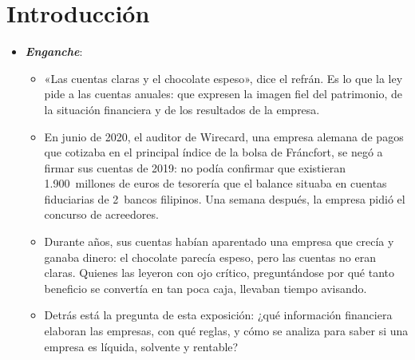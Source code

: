 \documentclass[11pt]{article}
\begin{document}
\tceetitulo

\section*{Introducción}

\begin{itemize}
\item \textbf{\emph{Enganche}}:
  \begin{itemize}
  \item «Las cuentas claras y el chocolate espeso», dice el refrán. Es lo que la ley pide a las cuentas anuales: que expresen la imagen fiel del patrimonio, de la situación financiera y de los resultados de la empresa.
  \item En junio de 2020, el auditor de Wirecard, una empresa alemana de pagos que cotizaba en el principal índice de la bolsa de Fráncfort, se negó a firmar sus cuentas de 2019: no podía confirmar que existieran 1.900~millones de euros de tesorería que el balance situaba en cuentas fiduciarias de 2~bancos filipinos. Una semana después, la empresa pidió el concurso de acreedores\nocite{OCCRP2020Wirecard}.
  \item Durante años, sus cuentas habían aparentado una empresa que crecía y ganaba dinero: el chocolate parecía espeso, pero las cuentas no eran claras. Quienes las leyeron con ojo crítico, preguntándose por qué tanto beneficio se convertía en tan poca caja, llevaban tiempo avisando.
  \item Detrás está la pregunta de esta exposición: ¿qué información financiera elaboran las empresas, con qué reglas, y cómo se analiza para saber si una empresa es líquida, solvente y rentable?
  \end{itemize}


\end{itemize}
\end{document}
